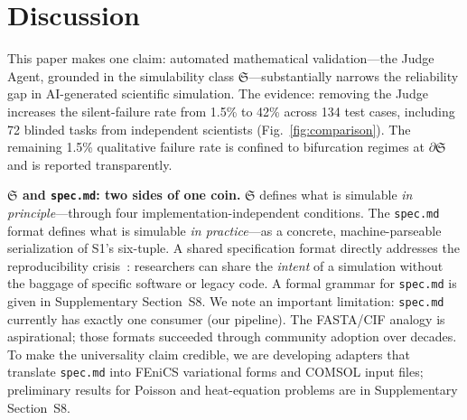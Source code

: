 \documentclass[11pt,a4paper]{article}
\newcommand{\Sclass}{\mathfrak{S}}
\begin{document}
\section{Discussion}

This paper makes one claim: automated mathematical validation---the Judge Agent, grounded in the simulability class $\Sclass$---substantially narrows the reliability gap in AI-generated scientific simulation. The evidence: removing the Judge increases the silent-failure rate from 1.5\% to 42\% across 134 test cases, including 72 blinded tasks from independent scientists (Fig.~\ref{fig:comparison}). The remaining 1.5\% qualitative failure rate is confined to bifurcation regimes at $\partial \Sclass$ and is reported transparently.

\textbf{$\Sclass$ and \texttt{spec.md}: two sides of one coin.} $\Sclass$ defines what is simulable \emph{in principle}---through four implementation-independent conditions. The \texttt{spec.md} format defines what is simulable \emph{in practice}---as a concrete, machine-parseable serialization of S1's six-tuple. A shared specification format directly addresses the reproducibility crisis~\cite{baker2016,peng2011}: researchers can share the \emph{intent} of a simulation without the baggage of specific software or legacy code. A formal grammar for \texttt{spec.md} is given in Supplementary Section~S8. We note an important limitation: \texttt{spec.md} currently has exactly one consumer (our pipeline). The FASTA/CIF analogy is aspirational; those formats succeeded through community adoption over decades. To make the universality claim credible, we are developing adapters that translate \texttt{spec.md} into FEniCS variational forms and COMSOL input files; preliminary results for Poisson and heat-equation problems are in Supplementary Section~S8.
\end{document}
